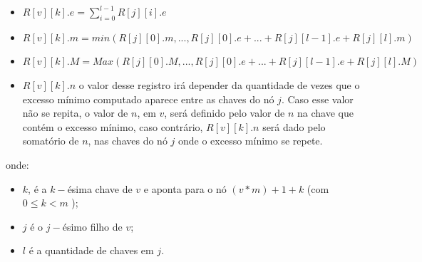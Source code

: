 \begin{itemize}
    \item $R[v][k].e = \displaystyle{\sum_{i=0}^{l-1} R[j][i].e} $
    \item $R[v][k].m = min(R[j][0].m, ... , R[j][0].e + ... + R[j][l-1].e + R[j][l].m )$
    \item $R[v][k].M = Max(R[j][0].M, ... , R[j][0].e + ... + R[j][l-1].e + R[j][l].M )$
    \item $R[v][k].n$ o valor desse registro irá depender da quantidade de vezes que o excesso mínimo computado aparece entre as chaves do nó $j$.
    Caso esse valor não se repita, o valor de $n$, em $v$, será definido pelo valor de $n$ na chave que contém o excesso mínimo,
    caso contrário, $R[v][k].n$ será dado pelo somatório de $n$, nas chaves do nó $j$ onde o excesso mínimo se repete. 
\end{itemize}

onde:
\begin{itemize}
    \item $k$, é a $k-$ésima chave de $v$ e aponta para o nó $(v*m)+1+k$ (com $0 \leq k <  m$ );
    \item $j$ é o $j-$ésimo filho de $v$;
    \item $l$ é a quantidade de chaves em $j$.
\end{itemize}


